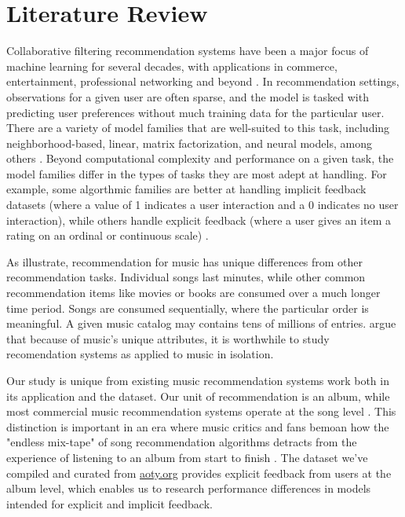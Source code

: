 \documentclass{article}
\begin{document}
\section{Literature Review}
Collaborative filtering recommendation systems have been a major focus of
 machine learning for several decades, with applications in commerce,
 entertainment, professional networking and beyond
 \citep{smithTwoDecadesOfRecommenderSystemsAtAmazon.com2017,gomezUribeTheNetflixRecommenderSystem2016}.
In recommendation settings, observations for a given user are often sparse, and
 the model is tasked with predicting user preferences without much training data
 for the particular user.
There are a variety of model families that are well-suited to this task,
 including neighborhood-based, linear, matrix factorization, and neural models,
 among others \citep{anelliTopNRecommendationAlgorithms2022}.
Beyond computational complexity and performance on a given task, the model
 families differ in the types of tasks they are most adept at handling.
For example, some algorthmic families are better at handling implicit feedback
 datasets (where a value of 1 indicates a user interaction and a 0 indicates no
 user interaction), while others handle explicit feedback (where a user gives an
 item a rating on an ordinal or continuous scale)
 \citep{steckEmbarrassinglyShallowAutoencoders2019}.

As \citet{Schedl2018} illustrate, recommendation for music has unique
 differences from other recommendation tasks.
Individual songs last minutes, while other common recommendation items like
 movies or books are consumed over a much longer time period.
Songs are consumed sequentially, where the particular order is meaningful.
A given music catalog may contains tens of millions of entries.
\citet{Schedl2018} argue that because of music's unique attributes, it is
 worthwhile to study recomendation systems as applied to music in isolation.

Our study is unique from existing music recommendation systems work both in its
 application and the dataset.
Our unit of recommendation is an album, while most commercial music
 recommendation systems operate at the song level \citep{Schedl2018}.
This distinction is important in an era where music critics and fans bemoan how
 the "endless mix-tape" of song recommendation algorithms detracts from the
 experience of listening to an album from start to finish
 \citep{toth2018,hilton2013}.
The dataset we've compiled and curated from \url{aoty.org} provides explicit
 feedback from users at the album level, which enables us to research
 performance differences in models intended for explicit and implicit feedback.
\end{document}
